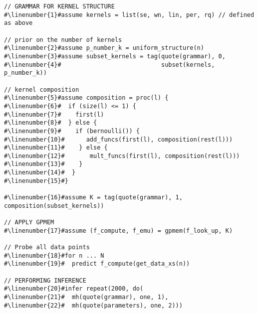 \begin{mdframed}
\begin{minipage}{\linewidth}
\small
\belowcaptionskip=-10pt
\begin{lstlisting}[mathescape,label=alg:structureVent,basicstyle=\selectfont\ttfamily,numbers=none,caption={Structure
Learning},escapechar=\#]
// GRAMMAR FOR KERNEL STRUCTURE
#\linenumber{1}#assume kernels = list(se, wn, lin, per, rq) // defined as above

// prior on the number of kernels
#\linenumber{2}#assume p_number_k = uniform_structure(n)
#\linenumber{3}#assume subset_kernels = tag(quote(grammar), 0,
#\linenumber{4}#                            subset(kernels, p_number_k))

// kernel composition
#\linenumber{5}#assume composition = proc(l) {
#\linenumber{6}#  if (size(l) <= 1) {
#\linenumber{7}#    first(l)
#\linenumber{8}#  } else {
#\linenumber{9}#    if (bernoulli()) {
#\linenumber{10}#      add_funcs(first(l), composition(rest(l)))
#\linenumber{11}#    } else {
#\linenumber{12}#       mult_funcs(first(l), composition(rest(l)))
#\linenumber{13}#    }
#\linenumber{14}#  }
#\linenumber{15}#}

#\linenumber{16}#assume K = tag(quote(grammar), 1, composition(subset_kernels))

// APPLY GPMEM
#\linenumber{17}#assume (f_compute, f_emu) = gpmem(f_look_up, K)

// Probe all data points
#\linenumber{18}#for n ... N
#\linenumber{19}#  predict f_compute(get_data_xs(n))

// PERFORMING INFERENCE
#\linenumber{20}#infer repeat(2000, do(
#\linenumber{21}#  mh(quote(grammar), one, 1),
#\linenumber{22}#  mh(quote(parameters), one, 2)))
\end{lstlisting}

\end{minipage}
\end{mdframed}
